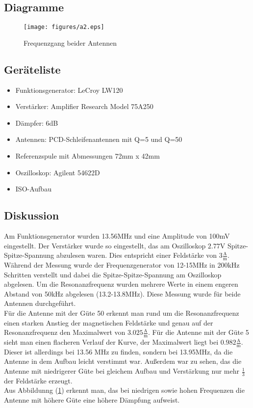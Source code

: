 \documentclass[12pt,a4paper,ngerman]{article}
\begin{document}
\subsection{Diagramme}
\begin{figure}[H]
\centering
\texttt{[image: figures/a2.eps]} 
\caption{Frequenzgang beider Antennen}\label{fig:a2}
\end{figure}

\subsection{Geräteliste}
\begin{itemize}
\item Funktionsgenerator: LeCroy LW120
\item Verstärker: Amplifier Research Model 75A250
\item Dämpfer: 6dB
\item Antennen: PCD-Schleifenantennen mit Q=5 und Q=50
\item Referenzspule mit Abmessungen 72mm x 42mm
\item Oszilloskop: Agilent 54622D
\item ISO-Aufbau
\end{itemize}


\subsection{Diskussion}
Am Funktionsgenerator wurden 13.56MHz und eine Amplitude von 100mV eingestellt. Der Verstärker wurde so eingestellt, das am Oszilloskop $2.77$V Spitze-Spitze-Spannung abzulesen waren. 
Dies entspricht einer Feldstärke von $3 \frac{\text{A}}{\text{m}}$. \\
Während der Messung wurde der Frequenzgenerator von 12-15MHz in 200kHz Schritten verstellt und dabei die Spitze-Spitze-Spannung am Oszilloskop abgelesen. Um die Resonanzfrequenz wurden mehrere Werte in einem engeren Abstand von 50kHz abgelesen (13.2-13.8MHz).
Diese Messung wurde für beide Antennen durchgeführt. \\
Für die Antenne mit der Güte 50 erkennt man rund um die Resonanzfrequenz einen starken Anstieg der magnetischen Feldstärke und genau auf der Resonanzfrequenz den Maximalwert von $3.025\frac{\text{A}}{\text{m}}$. Für die Antenne mit der Güte 5 sieht man einen flacheren Verlauf der Kurve, der Maximalwert liegt bei $0.982\frac{\text{A}}{\text{m}}$. Dieser ist allerdings bei 13.56 MHz zu finden, sondern bei 13.95MHz, da die Antenne in dem Aufbau leicht verstimmt war. Außerdem war zu sehen, das die Antenne mit niedrigerer Güte bei gleichem Aufbau und Verstärkung nur mehr $\frac{1}{3}$ der Feldstärke erzeugt. \\
Aus Abbildunng (\ref{fig:a2}) erkennt man, das bei niedrigen sowie hohen Frequenzen die Antenne mit höhere Güte eine höhere Dämpfung aufweist. 
\pagebreak
\end{document}
